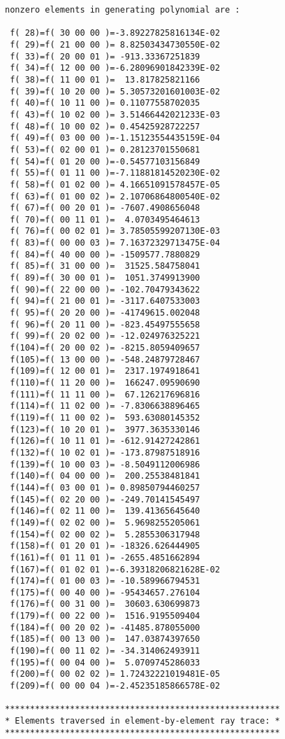 \begin{footnotesize}
\begin{verbatim}
nonzero elements in generating polynomial are :

 f( 28)=f( 30 00 00 )=-3.89227825816134E-02
 f( 29)=f( 21 00 00 )= 8.82503434730550E-02
 f( 33)=f( 20 00 01 )= -913.33367251839
 f( 34)=f( 12 00 00 )=-6.28096901842339E-02
 f( 38)=f( 11 00 01 )=  13.817825821166
 f( 39)=f( 10 20 00 )= 5.30573201601003E-02
 f( 40)=f( 10 11 00 )= 0.11077558702035
 f( 43)=f( 10 02 00 )= 3.51466442021233E-03
 f( 48)=f( 10 00 02 )= 0.45425928722257
 f( 49)=f( 03 00 00 )=-1.15123554435159E-04
 f( 53)=f( 02 00 01 )= 0.28123701550681
 f( 54)=f( 01 20 00 )=-0.54577103156849
 f( 55)=f( 01 11 00 )=-7.11881814520230E-02
 f( 58)=f( 01 02 00 )= 4.16651091578457E-05
 f( 63)=f( 01 00 02 )= 2.10706864800540E-02
 f( 67)=f( 00 20 01 )= -7607.4908656048
 f( 70)=f( 00 11 01 )=  4.0703495464613
 f( 76)=f( 00 02 01 )= 3.78505599207130E-03
 f( 83)=f( 00 00 03 )= 7.16372329713475E-04
 f( 84)=f( 40 00 00 )= -1509577.7880829
 f( 85)=f( 31 00 00 )=  31525.584758041
 f( 89)=f( 30 00 01 )=  1051.3749913900
 f( 90)=f( 22 00 00 )= -102.70479343622
 f( 94)=f( 21 00 01 )= -3117.6407533003
 f( 95)=f( 20 20 00 )= -41749615.002048
 f( 96)=f( 20 11 00 )= -823.45497555658
 f( 99)=f( 20 02 00 )= -12.024976325221
 f(104)=f( 20 00 02 )= -8215.8059409657
 f(105)=f( 13 00 00 )= -548.24879728467
 f(109)=f( 12 00 01 )=  2317.1974918641
 f(110)=f( 11 20 00 )=  166247.09590690
 f(111)=f( 11 11 00 )=  67.126217696816
 f(114)=f( 11 02 00 )= -7.8306638896465
 f(119)=f( 11 00 02 )=  593.63080145352
 f(123)=f( 10 20 01 )=  3977.3635330146
 f(126)=f( 10 11 01 )= -612.91427242861
 f(132)=f( 10 02 01 )= -173.87987518916
 f(139)=f( 10 00 03 )= -8.5049112006986
 f(140)=f( 04 00 00 )=  200.25538481841
 f(144)=f( 03 00 01 )= 0.89850794460257
 f(145)=f( 02 20 00 )= -249.70141545497
 f(146)=f( 02 11 00 )=  139.41365645640
 f(149)=f( 02 02 00 )=  5.9698255205061
 f(154)=f( 02 00 02 )=  5.2855306317948
 f(158)=f( 01 20 01 )= -18326.626444905
 f(161)=f( 01 11 01 )= -2655.4851662894
 f(167)=f( 01 02 01 )=-6.39318206821628E-02
 f(174)=f( 01 00 03 )= -10.589966794531
 f(175)=f( 00 40 00 )= -95434657.276104
 f(176)=f( 00 31 00 )=  30603.630699873
 f(179)=f( 00 22 00 )=  1516.9195509404
 f(184)=f( 00 20 02 )= -41485.878055000
 f(185)=f( 00 13 00 )=  147.03874397650
 f(190)=f( 00 11 02 )= -34.314062493911
 f(195)=f( 00 04 00 )=  5.0709745286033
 f(200)=f( 00 02 02 )= 1.72432221019481E-05
 f(209)=f( 00 00 04 )=-2.45235185866578E-02

*******************************************************
* Elements traversed in element-by-element ray trace: *
*******************************************************


\end{verbatim}
\end{footnotesize}
